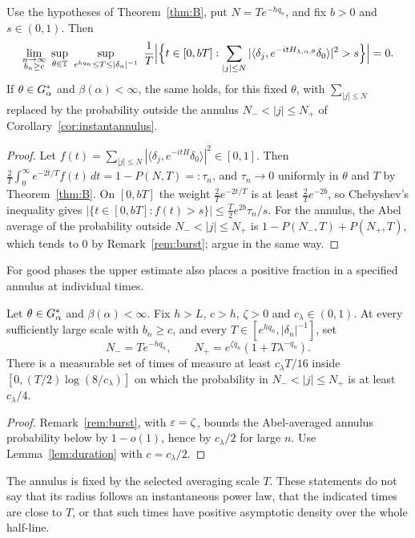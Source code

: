 \begin{corollary}\label{cor:almostalltimes}
Use the hypotheses of Theorem~\ref{thm:B}, put $N=Te^{-hq_n}$, and fix $b>0$ and $s\in(0,1)$. Then
\[
\lim_{\substack{n\to\infty\\ b_n\ge c}}\ \sup_{\theta\in\T}\ \sup_{e^{hq_n}\le T\le|\delta_n|^{-1}}\ \frac1T\Bigl|\Bigl\{t\in[0,bT]:\sum_{|j|\le N}|\langle\delta_j,e^{-itH_{\lambda,\alpha,\theta}}\delta_0\rangle|^2>s\Bigr\}\Bigr|=0 .
\]
If $\theta\in G_\alpha^*$ and $\beta(\alpha)<\infty$, the same holds, for this fixed $\theta$, with $\sum_{|j|\le N}$ replaced by the probability outside the annulus $N_-<|j|\le N_+$ of Corollary~\ref{cor:instantannulus}.
\end{corollary}
\begin{proof}
Let $f(t)=\sum_{|j|\le N}|\langle\delta_j,e^{-itH}\delta_0\rangle|^2\in[0,1]$. Then $\frac2T\int_0^\infty e^{-2t/T}f(t)\,dt=1-P(N,T)=:\tau_n$, and $\tau_n\to0$ uniformly in $\theta$ and $T$ by Theorem~\ref{thm:B}. On $[0,bT]$ the weight $\frac2Te^{-2t/T}$ is at least $\frac2Te^{-2b}$, so Chebyshev's inequality gives $|\{t\in[0,bT]:f(t)>s\}|\le\frac T2e^{2b}\tau_n/s$. For the annulus, the Abel average of the probability outside $N_-<|j|\le N_+$ is $1-P(N_-,T)+P(N_+,T)$, which tends to $0$ by Remark~\ref{rem:burst}; argue in the same way.
\end{proof}


For good phases the upper estimate also places a positive fraction in a specified annulus at individual times.
\begin{corollary}\label{cor:instantannulus}
Let $\theta\in G_\alpha^*$ and $\beta(\alpha)<\infty$. Fix $h>L$, $c>h$, $\zeta>0$ and $c_\lambda\in(0,1)$.
At every sufficiently large scale with $b_n\ge c$, and every
$T\in[e^{hq_n},|\delta_n|^{-1}]$, set
\[
N_-=Te^{-hq_n},\qquad
N_+=e^{\zeta q_n}(1+T\lambda^{-q_n}).
\]
There is a measurable set of times of measure at least $c_\lambda T/16$ inside
$[0,(T/2)\log(8/c_\lambda)]$ on which the probability in
$N_-<|j|\le N_+$ is at least $c_\lambda/4$.
\end{corollary}
\begin{proof}
Remark~\ref{rem:burst}, with $\varepsilon=\zeta$, bounds the Abel-averaged annulus probability below by $1-o(1)$, hence by $c_\lambda/2$ for large $n$.
Use Lemma~\ref{lem:duration} with $c=c_\lambda/2$.
\end{proof}

The annulus is fixed by the selected averaging scale $T$. These statements do not say that its radius follows an instantaneous power law, that the indicated times are close to $T$, or that such times have positive asymptotic density over the whole half-line.

